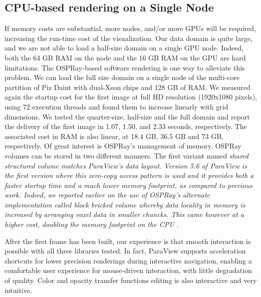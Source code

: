 \documentclass[5p,times]{elsarticle}
\begin{document}
\subsection{CPU-based rendering on a Single Node}
If memory costs are substantial, more nodes, and/or more GPUs will be required,
increasing the run-time cost of the visualization. Our data domain is quite large, and we are not able to load a half-size domain on a single GPU node. Indeed, both
the 64 GB RAM on the node and the 16 GB RAM on the GPU are hard limitations.
The OSPRay-based software rendering is one way to alleviate this problem. We can load the full size
domain on a single node of the multi-core partition of Piz Daint with dual-Xeon
chips and 128 GB of RAM. We measured again the startup cost for the first image
at full HD resolution (1920x1080 pixels),
using 72 execution threads and found them to increase linearly with grid dimensions.
We tested the quarter-size, half-size and the full domain and report the delivery
of the first image in 1.07, 1.50, and 2.33 seconds, respectively. The associated cost
in RAM is also linear, at 18.4 GB, 36.5 GB and 73 GB, respectively. Of great interest
is OSPRay's management of memory. OSPRay volumes can be stored in two different manners.
The first variant named \it{shared structured volume} \rm matches ParaView's data layout.
Version 5.6 of ParaView is the first version where this zero-copy access pattern is used
and it provides both a faster startup time and a much lower memory footprint, as compared
to previous work. Indeed, we reported earlier on
the use of OSPRay's alternate implementation called \it{block bricked volume} \rm whereby
data locality in memory is increased by arranging voxel data in smaller chuncks. This came
however at a higher cost, doubling the memory footprint on the CPU \cite{SC18ThermalConvection}. 
 
After the first frame has been built, our experience is that smooth interaction
is possible with all three libraries tested. In fact, ParaView supports acceleration
shortcuts for lower precision renderings during interactive navigation,
enabling a comfortable user experience for mouse-driven interaction,
with little degradation of quality. 
Color and opacity transfer functions editing is also interactive and very intuitive.
\end{document}
